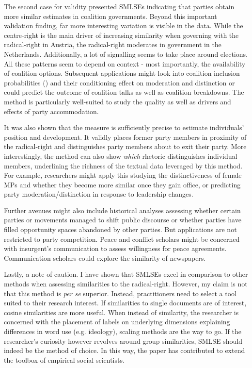 \documentclass{article}
\begin{document}
The second case for validity presented SMLSEs indicating that parties obtain more similar estimates in coalition governments. Beyond this important validation finding, far more interesting variation is visible in the data. While the centre-right is the main driver of increasing similarity when governing with the radical-right in Austria, the radical-right moderates in government in the Netherlands. Additionally, a lot of signalling seems to take place around elections. All these patterns seem to depend on context - most importantly, the availability of coalition options. Subsequent applications might look into coalition inclusion probabilities (\cite{Kayser2019Coalition}) and their conditioning effect on moderation and distinction or could predict the outcome of coalition talks as well as coalition breakdowns. The method is particularly well-suited to study the quality as well as drivers and effects of party accommodation.\par

It was also shown that the measure is sufficiently precise to estimate individuals' position and development. It validly places former party members in proximity of the radical-right and distinguishes party members about to exit their party. More interestingly, the method can also show \textit{which} rhetoric distinguishes individual members, underlining the richness of the textual data leveraged by this method. For example, researchers might apply this studying the distinctiveness of female MPs and whether they become more similar once they gain office, or predicting party moderation/distinction in response to leadership changes. \par

Further avenues might also include historical analyses assessing whether certain parties or movements managed to shift public discourse or whether parties have filled opportunity spaces abandoned by other parties. But applications are not restricted to party competition. Peace and conflict scholars might be concerned with insurgent's communication to assess willingness for peace agreements. Communication scholars could explore the similarity of newspapers. \par

Lastly, a note of caution. I have shown that SMLSEs excel in comparison to other methods when assessing similarities to the radical-right. However, my claim is not that this method is \textit{per se} superior. Instead, practitioners need to select a tool suited to their research interest. If similarities to single documents are of interest, cosine similarities are more useful. When instead of similarity, the researcher is concerned with the placement of labels on underlying dimensions explaining differences in word use (e.g. ideology), scaling methods are the way to go. If the researcher's curiosity however revolves around group similarities, SMLSE should indeed be the method of choice. In this way, the paper has contributed to extend the toolbox of empirical social scientists. \par
\end{document}
